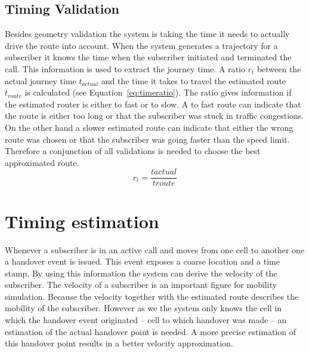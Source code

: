 \documentclass[master,english]{hgbthesis}
\begin{document}
\subsection{Timing Validation}
Besides geometry validation the system is taking the time it needs to actually drive the route into account. When the system generates a trajectory for a subscriber it knows the time when the subscriber initiated and terminated the call. This information is used to extract the journey time. A ratio $r_t$ between the actual journey time $t_{actual}$ and the time it takes to travel the estimated route $t_{route}$ is calculated (see Equation~\ref{eq:timeratio}). The ratio gives information if the estimated router is either to fast or to slow. A to fast route can indicate that the route is either too long or that the subscriber was stuck in traffic congestions. On the other hand a slower estimated route can indicate that either the wrong route was chosen or that the subscriber was going faster than the speed limit. Therefore a conjunction of all validations is needed to choose the best approximated route.
\begin{equation}
	r_{t}=\frac{t{actual}}{t{route}}
	\label{eq:timeratio}
\end{equation} 
\section{Timing estimation}
\label{sec:timing-estimation}
Whenever a subscriber is in an active call and moves from one cell to another one a handover event is issued. This event exposes a coarse location and a time stamp. By using this information the system can derive the velocity of the subscriber. The velocity of a subscriber is an important figure for mobility simulation. Because the velocity together with the estimated route describes the mobility of the subscriber. However as we the system only knows the cell in which the handover event originated -- cell to which handover was made -- an estimation of the actual handover point is needed. A more precise estimation of this handover point results in a better velocity approximation.
\end{document}
